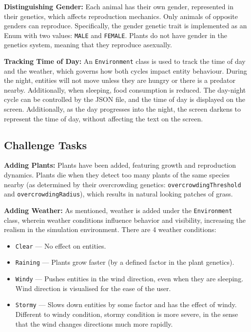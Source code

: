 \documentclass[10pt, a4paper]{scrartcl}
\begin{document}
\begin{multicols}{2}
    \noindent \textbf{Distinguishing Gender:} Each animal has their own gender, represented in their genetics,
    which affects reproduction mechanics. Only animals of opposite genders can reproduce. Specifically, the gender genetic trait
    is implemented as an Enum with two values: \verb|MALE| and \verb|FEMALE|. Plants do not have gender in the genetics system,
    meaning that they reproduce asexually.

    \noindent \textbf{Tracking Time of Day:} An \verb|Environment| class is used to track the time of day and the weather,
    which governs how both cycles impact entity behaviour. During the night, entities will not move unless they are hungry
    or there is a predator nearby. Additionally, when sleeping, food consumption is reduced. The day-night cycle can be controlled
    by the JSON file, and the time of day is displayed on the screen. Additionally, as the day progresses into the night,
    the screen darkens to represent the time of day, without affecting the text on the screen.

    \subsection{Challenge Tasks}

    \noindent \textbf{Adding Plants:} Plants have been added, featuring growth and reproduction dynamics.
    Plants die when they detect too many plants of the same species nearby (as determined by their overcrowding genetics:
    \verb|overcrowdingThreshold| and \verb|overcrowdingRadius|), which results in natural looking patches of grass.

    \noindent \textbf{Adding Weather:} As mentioned, weather is added under the \verb|Environment| class, wherein
    weather conditions influence behavior and visibility, increasing the realism in the simulation environment.
    There are 4 weather conditions:
    \begin{itemize}
      \item \verb|Clear| — No effect on entities.
      \item \verb|Raining| — Plants grow faster (by a defined factor in the plant genetics).
      \item \verb|Windy| — Pushes entities in the wind direction, even when they are sleeping.
      Wind direction is visualised for the ease of the user.
      \item \verb|Stormy| — Slows down entities by some factor and has the effect of windy. Different to
      windy condition, stormy condition is more severe, in the sense that the wind changes directions much more rapidly.
    \end{itemize}


\end{multicols}
\end{document}
